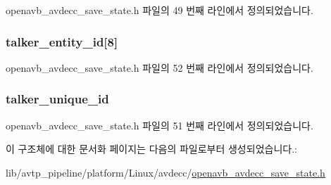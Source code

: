 openavb\+\_\+avdecc\+\_\+save\+\_\+state.\+h 파일의 49 번째 라인에서 정의되었습니다.

\subsubsection[{\texorpdfstring{talker\+\_\+entity\+\_\+id}{talker_entity_id}}]{ talker\+\_\+entity\+\_\+id\mbox{[}8\mbox{]}}\hypertarget{structopenavb__saved__state_a9a599b9c25c2171c3e76f269d9a04f51}{}\label{structopenavb__saved__state_a9a599b9c25c2171c3e76f269d9a04f51}


openavb\+\_\+avdecc\+\_\+save\+\_\+state.\+h 파일의 52 번째 라인에서 정의되었습니다.

\subsubsection[{\texorpdfstring{talker\+\_\+unique\+\_\+id}{talker_unique_id}}]{ talker\+\_\+unique\+\_\+id}\hypertarget{structopenavb__saved__state_a545e994bde6218210bb41265ac298837}{}\label{structopenavb__saved__state_a545e994bde6218210bb41265ac298837}


openavb\+\_\+avdecc\+\_\+save\+\_\+state.\+h 파일의 51 번째 라인에서 정의되었습니다.



이 구조체에 대한 문서화 페이지는 다음의 파일로부터 생성되었습니다.\+:\begin{DoxyCompactItemize}
\item 
lib/avtp\+\_\+pipeline/platform/\+Linux/avdecc/\hyperlink{openavb__avdecc__save__state_8h}{openavb\+\_\+avdecc\+\_\+save\+\_\+state.\+h}\end{DoxyCompactItemize}
